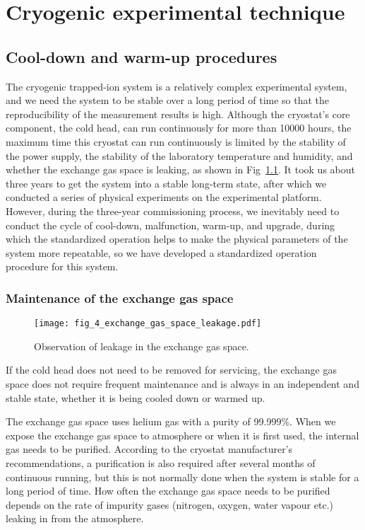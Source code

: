 
\chapter{Cryogenic experimental technique}

\section{Cool-down and warm-up procedures}

The cryogenic trapped-ion system is a relatively complex experimental system, and we need the system to be stable over a long period of time so that the reproducibility of the measurement results is high. Although the cryostat's core component, the cold head, can run continuously for more than 10000 hours, the maximum time this cryostat can run continuously is limited by the stability of the power supply, the stability of the laboratory temperature and humidity, and whether the exchange gas space is leaking, as shown in Fig~\ref{fig:fig_4_exchange_gas_space_leakage}. It took us about three years to get the system into a stable long-term state, after which we conducted a series of physical experiments on the experimental platform. However, during the three-year commissioning process, we inevitably need to conduct the cycle of cool-down, malfunction, warm-up, and upgrade, during which the standardized operation helps to make the physical parameters of the system more repeatable, so we have developed a standardized operation procedure for this system.

\subsection{Maintenance of the exchange gas space}

\begin{figure}
    \centering
    \texttt{[image: fig\_4\_exchange\_gas\_space\_leakage.pdf]}
    \caption{Observation of leakage in the exchange gas space.}
    \label{fig:fig_4_exchange_gas_space_leakage}
\end{figure}

If the cold head does not need to be removed for servicing, the exchange gas space does not require frequent maintenance and is always in an independent and stable state, whether it is being cooled down or warmed up.

The exchange gas space uses helium gas with a purity of 99.999\%. When we expose the exchange gas space to atmosphere or when it is first used, the internal gas needs to be purified. According to the cryostat manufacturer's recommendations, a purification is also required after several months of continuous running, but this is not normally done when the system is stable for a long period of time. How often the exchange gas space needs to be purified depends on the rate of impurity gases (nitrogen, oxygen, water vapour etc.) leaking in from the atmosphere.

